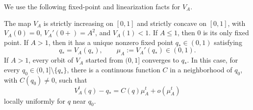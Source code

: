 \documentclass[11pt,reqno,a4paper]{article}
\begin{document}
We use the following fixed-point and linearization facts for $V_A$.
\begin{lemma}
\label{lem:gaussian-mean-field-concavity}
  The map $V_A$ is strictly increasing on $[0,1]$ and strictly concave on
  $[0,1]$, with $V_A(0)=0$, $V_A'(0+)=A^2$, and $V_A(1)<1$. If
  $A\leq1$, then $0$ is its only fixed point. If $A>1$, then it has a unique
  nonzero fixed point $q_\ast\in(0,1)$ satisfying
  \begin{equation}\label{eq:gaussian-fixed-point}
    q_\ast=V_A(q_\ast),
    \qquad
    \mu_A:=V_A'(q_\ast)\in(0,1).
  \end{equation}
  If $A>1$, every orbit of $V_A$ started from $(0,1]$ converges to $q_\ast$.
  In this case, for every $q_0\in(0,1]\setminus\{q_\ast\}$, there is a
  continuous function $C$ in a neighborhood of $q_0$, with $C(q_0)\neq0$,
  such that
  \begin{equation}\label{eq:gaussian-deterministic-asymptotic}
    V_A^t(q)-q_\ast
    =
    C(q)\mu_A^t+o(\mu_A^t)
  \end{equation}
  locally uniformly for $q$ near $q_0$.
\end{lemma}
\end{document}
